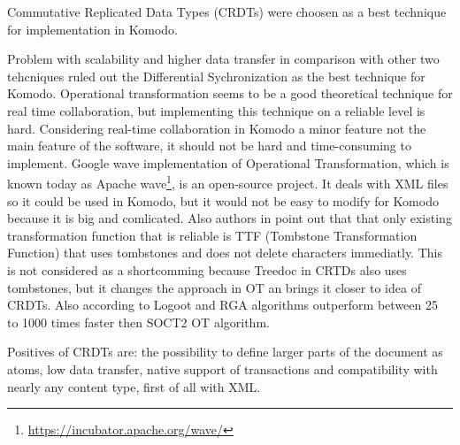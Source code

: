 \documentclass[12pt,oneside]{fithesis2}
\begin{document}
Commutative Replicated Data Types (CRDTs) were choosen as a best technique for implementation in Komodo. 
\par Problem with scalability and higher data transfer in comparison with other two tehcniques ruled out the Differential Sychronization as the best technique for Komodo. Operational transformation seems to be a good theoretical technique for real time collaboration, but implementing this technique on a reliable level is hard. Considering real-time collaboration in Komodo a minor feature not the main feature of the software, it should not be hard and time-consuming to implement. Google wave implementation of Operational Transformation, which is known today as Apache wave\footnote{\url{https://incubator.apache.org/wave/}}, is an open-source project. It deals with XML files so it could be used in Komodo, but it would not be easy to modify for Komodo because it is big and comlicated. Also authors in \cite{CRDT-real} point out that that only existing transformation function that is reliable is TTF (Tombstone Transformation Function)\cite{ttf} that uses tombstones and does not delete characters immediatly. This is not considered as a shortcomming because Treedoc in CRTDs also uses tombstones, but it changes the approach in OT an brings it closer to idea of CRDTs. Also according to \cite{CRDT-real} Logoot and RGA algorithms outperform between 25 to 1000 times faster then SOCT2 OT algorithm.
\par Positives of CRDTs are: the possibility to define larger parts of the document as atoms, low data transfer, native support of transactions and compatibility with nearly any content type, first of all with XML. 
\end{document}
